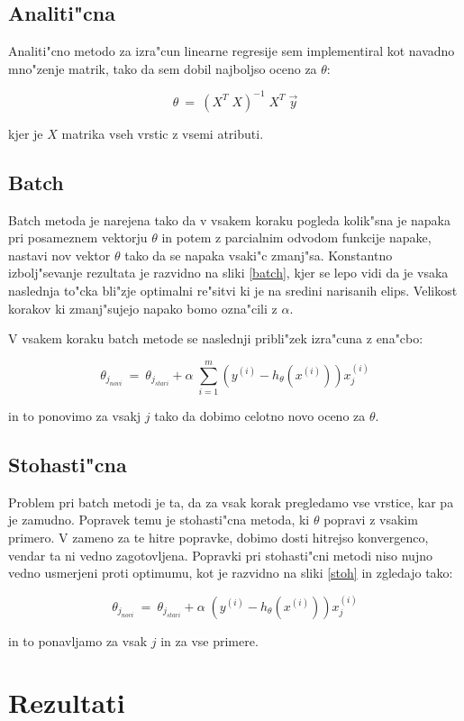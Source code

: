 \documentclass[a4paper,11pt]{article}
\begin{document}
\subsection{Analiti"cna}
Analiti"cno metodo za izra"cun linearne regresije sem implementiral kot navadno mno"zenje matrik, tako da sem dobil najboljso oceno za $\theta$:

\[ \theta \ =\ (X^T \; X)^{-1}\; X^T \; \vec{y} \]

kjer je $X$ matrika vseh vrstic z vsemi atributi.

\subsection{Batch}
Batch metoda je narejena tako da v vsakem koraku pogleda kolik"sna je napaka pri posameznem vektorju $\theta$ in potem z parcialnim odvodom funkcije napake, nastavi nov vektor $\theta$ tako da se napaka vsaki"c zmanj"sa. Konstantno izbolj"sevanje rezultata je razvidno na sliki \ref{batch}, kjer se lepo vidi da je vsaka naslednja to"cka bli"zje optimalni re"sitvi ki je na sredini narisanih elips. Velikost korakov ki zmanj"sujejo napako bomo ozna"cili z $\alpha$. 

V vsakem koraku batch metode se naslednji pribli"zek izra"cuna z ena"cbo:

\[  \theta_{j_{novi}} \ = \  \theta_{j_{stari}} + \alpha \; \sum_{i=1}^{m}(y^{(i)}-h_{\theta}(x^{(i)}))x_j^{(i)} \]

in to ponovimo za vsakj $j$ tako da dobimo celotno novo oceno za $ \theta $.


\subsection{Stohasti"cna}
Problem pri batch metodi je ta, da za vsak korak pregledamo vse vrstice, kar pa je zamudno. Popravek temu je stohasti"cna metoda, ki $\theta$ popravi z vsakim primero. V zameno za te hitre popravke, dobimo dosti hitrejso konvergenco, vendar ta ni vedno zagotovljena. Popravki pri stohasti"cni metodi niso nujno vedno usmerjeni proti optimumu, kot je razvidno na sliki \ref{stoh} in zgledajo tako:

\[  \theta_{j_{novi}} \ = \  \theta_{j_{stari}} + \alpha \; (y^{(i)}-h_{\theta}(x^{(i)}))x_j^{(i)} \]

in to ponavljamo za vsak $j$ in za vse primere.


\section{Rezultati}
\end{document}
